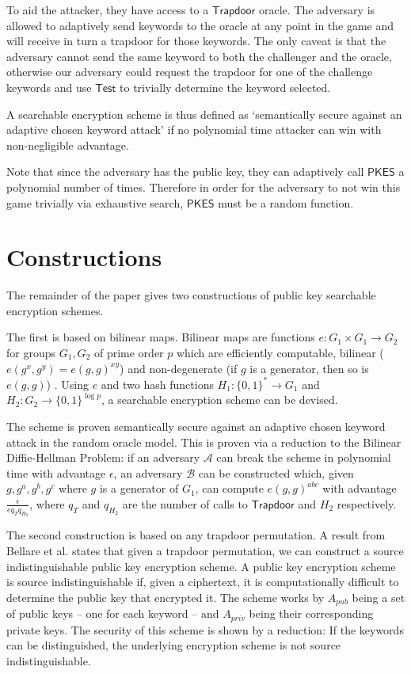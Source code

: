 \documentclass[a4paper,11pt]{article}
\begin{document}
    To aid the attacker, they have access to a $\mathsf{Trapdoor}$ oracle. The adversary is allowed to adaptively send keywords to the oracle at any point in the game and will receive in turn a trapdoor for those keywords. The only caveat is that the adversary cannot send the same keyword to both the challenger and the oracle, otherwise our adversary could request the trapdoor for one of the challenge keywords and use $\mathsf{Test}$ to trivially determine the keyword selected.

    A searchable encryption scheme is thus defined as `semantically secure against an adaptive chosen keyword attack' if no polynomial time attacker can win with non-negligible advantage.

    Note that since the adversary has the public key, they can adaptively call $\mathsf{PKES}$ a polynomial number of times. Therefore in order for the adversary to not win this game trivially via exhaustive search, $\mathsf{PKES}$ must be a random function.

    \section{Constructions}
    \label{constructions}

    The remainder of the paper gives two constructions of public key searchable encryption schemes.

    The first is based on bilinear maps. Bilinear maps are functions $e:G_1 \times G_1 \to G_2$ for groups $G_1, G_2$ of prime order $p$ which are efficiently computable, bilinear ($e(g^x, g^y) = e(g, g)^{xy}$) and non-degenerate (if $g$ is a generator, then so is $e(g,g)$) \cite{cryptoeprint:2003:195}. Using $e$ and two hash functions $H_1: \{0, 1\}^* \to G_1$ and $H_2: G_2 \to \{0, 1\}^{\log p}$, a searchable encryption scheme can be devised.

    The scheme is proven semantically secure against an adaptive chosen keyword attack in the random oracle model. This is proven via a reduction to the Bilinear Diffie-Hellman Problem: if an adversary $\mathcal{A}$ can break the scheme in polynomial time with advantage $\epsilon$, an adversary $\mathcal{B}$ can be constructed which, given $g, g^a, g^b, g^c$ where $g$ is a generator of $G_1$, can compute $e(g, g)^{abc}$ with advantage $\frac{\epsilon}{eq_Tq_{H_2}}$, where $q_T$ and $q_{H_2}$ are the number of calls to $\mathsf{Trapdoor}$ and $H_2$ respectively.

    The second construction is based on any trapdoor permutation. A result from Bellare et al. \cite{bellare:source} states that given a trapdoor permutation, we can construct a source indistinguishable public key encryption scheme. A public key encryption scheme is source indistinguishable if, given a ciphertext, it is computationally difficult to determine the public key that encrypted it. The scheme works by $A_{pub}$ being a set of public keys -- one for each keyword -- and $A_{priv}$ being their corresponding private keys. The security of this scheme is shown by a reduction: If the keywords can be distinguished, the underlying encryption scheme is not source indistinguishable.
\end{document}
